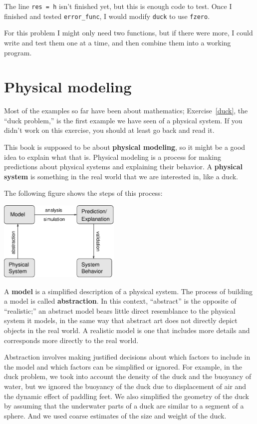 \documentclass{book}
\begin{document}
The line {\tt res = h} isn't finished yet, but this
is enough code to test.
Once I finished and tested {\tt error\_func}, I would modify
{\tt duck} to use {\tt fzero}.

For this problem I might only need two functions, but if there
were more, I could write and test them one at a time, and then
combine them into a working program.



\section{Physical modeling}
\label{modeling}

Most of the examples so far have been about mathematics;
Exercise~\ref{duck}, the ``duck problem,'' is the first example we
have seen of a physical system. If you didn't work on this exercise,
you should at least go back and read it.

This book is supposed to be about {\bf physical modeling}, so it might
be a good idea to explain what that is. Physical modeling is a process
for making predictions about physical systems and explaining their
behavior. A {\bf physical system} is something in the real
world that we are interested in, like a duck.

The following figure shows the steps of this process:

\beforefig \centerline{\includegraphics[height=1.5in]{figs/model.eps}}

A {\bf model} is a simplified description of a physical system. The
process of building a model is called {\bf abstraction}. In this
context, ``abstract'' is the opposite of ``realistic;'' an abstract
model bears little direct resemblance to the physical system it
models, in the same way that abstract art does not directly depict
objects in the real world. A realistic model is one that includes
more details and corresponds more directly to the real world.

Abstraction involves making justified decisions about which factors to
include in the model and which factors can be simplified or ignored.
For example, in the duck problem, we took into account the density of
the duck and the buoyancy of water, but we ignored the buoyancy of the
duck due to displacement of air and the dynamic effect of paddling
feet. We also simplified the geometry of the duck by assuming that
the underwater parts of a duck are similar to a segment of a sphere.
And we used coarse estimates of the size and weight of the duck.
\end{document}
